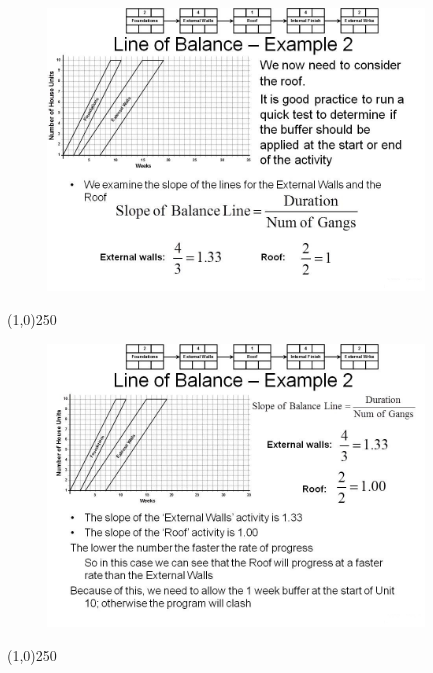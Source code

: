 \begin{frame}
\begin{figure}
	\centering
		\includegraphics[width = 10.0cm]{oldnotes/Slide260.jpg}
\end{figure}
\end{frame}
\begin{center}\line(1,0){250}\end{center}






\begin{frame}
\begin{figure}
	\centering
		\includegraphics[width = 10.0cm]{oldnotes/Slide261.jpg}
\end{figure}
\end{frame}
\begin{center}\line(1,0){250}\end{center}






